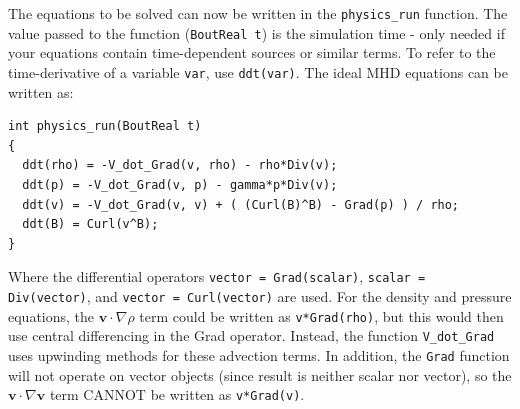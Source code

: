 \documentclass[12pt]{article}
\newcommand{\code}[1]{\texttt{#1}}
\begin{document}
The equations to be solved can now be written in the \code{physics\_run} function. The value
passed to the function (\code{BoutReal t}) is the simulation time - only needed if your
equations contain time-dependent sources or similar terms. To refer to the time-derivative
of a variable \code{var}, use \code{ddt(var)}. The ideal MHD equations can be written as:
\begin{lstlisting}
int physics_run(BoutReal t)
{
  ddt(rho) = -V_dot_Grad(v, rho) - rho*Div(v);
  ddt(p) = -V_dot_Grad(v, p) - gamma*p*Div(v);
  ddt(v) = -V_dot_Grad(v, v) + ( (Curl(B)^B) - Grad(p) ) / rho;
  ddt(B) = Curl(v^B);
}
\end{lstlisting}
Where the differential operators \code{vector = Grad(scalar)}, \code{scalar = Div(vector)}, and
\code{vector = Curl(vector)} are used. For the density and pressure equations, 
the $\mathbf{v}\cdot\nabla\rho$ term could be written as \code{v*Grad(rho)}, but this would then use
central differencing in the Grad operator. Instead, the function \code{V\_dot\_Grad} uses upwinding
methods for these advection terms. In addition, the \code{Grad} function will not operate
on vector objects (since result is neither scalar nor vector), so the $\mathbf{v}\cdot\nabla\mathbf{v}$ term CANNOT be written as \code{v*Grad(v)}. 
\end{document}

